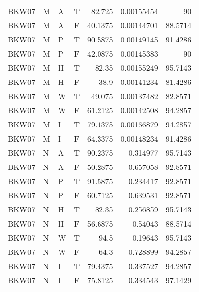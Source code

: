 \begin{tabular}{llllrrr}
    BKW07    & M     & A     & T          & 82.725     & 0.00155454  & 90       \\
    BKW07    & M     & A     & F          & 40.1375    & 0.00144701  & 88.5714  \\
    BKW07    & M     & P     & T          & 90.5875    & 0.00149145  & 91.4286  \\
    BKW07    & M     & P     & F          & 42.0875    & 0.00145383  & 90       \\
    BKW07    & M     & H     & T          & 82.35      & 0.00155249  & 95.7143  \\
    BKW07    & M     & H     & F          & 38.9       & 0.00141234  & 81.4286  \\
    BKW07    & M     & W     & T          & 49.075     & 0.00137482  & 82.8571  \\
    BKW07    & M     & W     & F          & 61.2125    & 0.00142508  & 94.2857  \\
    BKW07    & M     & I     & T          & 79.4375    & 0.00166879  & 94.2857  \\
    BKW07    & M     & I     & F          & 64.3375    & 0.00148234  & 91.4286  \\
    BKW07    & N     & A     & T          & 90.2375    & 0.314977    & 95.7143  \\
    BKW07    & N     & A     & F          & 50.2875    & 0.657058    & 92.8571  \\
    BKW07    & N     & P     & T          & 91.5875    & 0.234417    & 92.8571  \\
    BKW07    & N     & P     & F          & 60.7125    & 0.639531    & 92.8571  \\
    BKW07    & N     & H     & T          & 82.35      & 0.256859    & 95.7143  \\
    BKW07    & N     & H     & F          & 56.6875    & 0.54043     & 88.5714  \\
    BKW07    & N     & W     & T          & 94.5       & 0.19643     & 95.7143  \\
    BKW07    & N     & W     & F          & 64.3       & 0.728899    & 94.2857  \\
    BKW07    & N     & I     & T          & 79.4375    & 0.337527    & 94.2857  \\
    BKW07    & N     & I     & F          & 75.8125    & 0.334543    & 97.1429  \\
    \hline
\end{tabular}